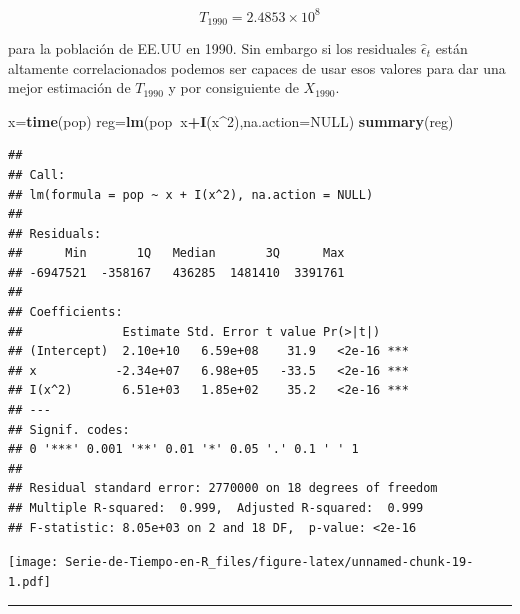 \documentclass[12pt,]{krantz}
\makeatletter
\newenvironment{Shaded}{\begin{snugshade}}{\end{snugshade}}
\newcommand{\KeywordTok}[1]{\textcolor[rgb]{0.13,0.29,0.53}{\textbf{#1}}}
\newcommand{\DataTypeTok}[1]{\textcolor[rgb]{0.13,0.29,0.53}{#1}}
\newcommand{\DecValTok}[1]{\textcolor[rgb]{0.00,0.00,0.81}{#1}}
\newcommand{\StringTok}[1]{\textcolor[rgb]{0.31,0.60,0.02}{#1}}
\newcommand{\OtherTok}[1]{\textcolor[rgb]{0.56,0.35,0.01}{#1}}
\newcommand{\OperatorTok}[1]{\textcolor[rgb]{0.81,0.36,0.00}{\textbf{#1}}}
\newcommand{\NormalTok}[1]{#1}
\newenvironment{kframe}{%
\medskip{}
\setlength{\fboxsep}{.8em}
 \def\at@end@of@kframe{}%
 \ifinner\ifhmode%
  \def\at@end@of@kframe{\end{minipage}}%
  \begin{minipage}{\columnwidth}%
 \fi\fi%
 \def\FrameCommand##1{\hskip\@totalleftmargin \hskip-\fboxsep
 \colorbox{shadecolor}{##1}\hskip-\fboxsep
     \hskip-\linewidth \hskip-\@totalleftmargin \hskip\columnwidth}%
 \MakeFramed {\advance\hsize-\width
   \@totalleftmargin\z@ \linewidth\hsize
   \@setminipage}}%
 {\par\unskip\endMakeFramed%
 \at@end@of@kframe}
\renewenvironment{Shaded}{\begin{kframe}}{\end{kframe}}
\theoremstyle{definition}
\theoremstyle{definition}
\theoremstyle{definition}
\theoremstyle{remark}
\makeatother
\begin{document}
\[T_{1990} = 2.4853\times10^8\]

para la población de EE.UU en 1990. Sin embargo si los residuales
\(\hat{\epsilon}_t\) están altamente correlacionados podemos ser capaces
de usar esos valores para dar una mejor estimación de \(T_{1990}\) y por
consiguiente de \(X_{1990}\).

\begin{Shaded}
\begin{Highlighting}[]
\NormalTok{x=}\KeywordTok{time}\NormalTok{(pop)}
\NormalTok{reg=}\KeywordTok{lm}\NormalTok{(pop}\OperatorTok{~}\NormalTok{x}\OperatorTok{+}\KeywordTok{I}\NormalTok{(x}\OperatorTok{^}\DecValTok{2}\NormalTok{),}\DataTypeTok{na.action=}\OtherTok{NULL}\NormalTok{)}
\KeywordTok{summary}\NormalTok{(reg)}
\end{Highlighting}
\end{Shaded}

\begin{verbatim}
## 
## Call:
## lm(formula = pop ~ x + I(x^2), na.action = NULL)
## 
## Residuals:
##      Min       1Q   Median       3Q      Max 
## -6947521  -358167   436285  1481410  3391761 
## 
## Coefficients:
##              Estimate Std. Error t value Pr(>|t|)    
## (Intercept)  2.10e+10   6.59e+08    31.9   <2e-16 ***
## x           -2.34e+07   6.98e+05   -33.5   <2e-16 ***
## I(x^2)       6.51e+03   1.85e+02    35.2   <2e-16 ***
## ---
## Signif. codes:  
## 0 '***' 0.001 '**' 0.01 '*' 0.05 '.' 0.1 ' ' 1
## 
## Residual standard error: 2770000 on 18 degrees of freedom
## Multiple R-squared:  0.999,  Adjusted R-squared:  0.999 
## F-statistic: 8.05e+03 on 2 and 18 DF,  p-value: <2e-16
\end{verbatim}

\begin{Shaded}
\end{Shaded}

\texttt{[image: Serie-de-Tiempo-en-R\_files/figure-latex/unnamed-chunk-19-1.pdf]}

\begin{center}\rule{0.5\linewidth}{\linethickness}\end{center}
\end{document}

